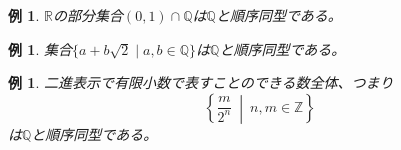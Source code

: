 \documentclass[leqno]{jsarticle}
\newtheorem{exam}[thm]{例}
\newcommand{\zz}{\mathbb{Z}}
\newcommand{\qq}{\mathbb{Q}}
\newcommand{\rr}{\mathbb{R}}
\begin{document}
\begin{exam}
$\rr$の部分集合$(0,1)\cap \qq$は$\qq$と順序同型である。
\end{exam}
\begin{exam}
集合$\{a+b\sqrt{2}\mid a,b\in \qq\}$は$\qq$と順序同型である。
\end{exam}
\begin{exam}
二進表示で有限小数で表すことのできる数全体、つまり
\[
\left\{\frac{m}{2^n}\ \middle|\  n,m\in \zz\right\}
\]
は$\qq$と順序同型である。
\end{exam}




















			
\end{document}
